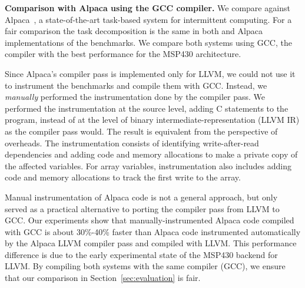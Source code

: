 
\textbf{Comparison with Alpaca using the GCC compiler.} We compare
\sys against Alpaca~\cite{alpaca}, a state-of-the-art task-based system for
intermittent computing. For a fair comparison the task decomposition is the
same in both \sys and Alpaca implementations of the benchmarks. We compare
both systems using GCC, the compiler with the best performance for the
MSP430 architecture.

Since Alpaca's compiler pass is implemented only for LLVM, we could not use it
to instrument the benchmarks and compile them with GCC. Instead, we
\emph{manually} performed the instrumentation done by the compiler pass.
We performed the instrumentation at the source level, adding C
statements to the program, instead of at the level of binary
intermediate-representation (LLVM IR) as the compiler pass would. The result is
equivalent from the perspective of overheads. The
instrumentation consists of identifying write-after-read dependencies and
adding code and memory allocations to make a private copy of the
affected variables. For array variables, instrumentation also includes adding
code and memory allocations to track the first write to the array.

Manual instrumentation of Alpaca code is not a general approach, but only
served as a practical alternative to porting the compiler pass from LLVM to
GCC.
%
Our experiments show that manually-instrumented Alpaca code compiled with GCC
is about 30\%-40\% faster than Alpaca code instrumented automatically by the
Alpaca LLVM compiler pass and compiled with LLVM.
%
%
This performance difference is due to the early experimental state of the
MSP430 backend for LLVM.
%
By compiling both systems with the same compiler (GCC), we ensure that our
comparison in Section~\ref{sec:evaluation} is fair.

